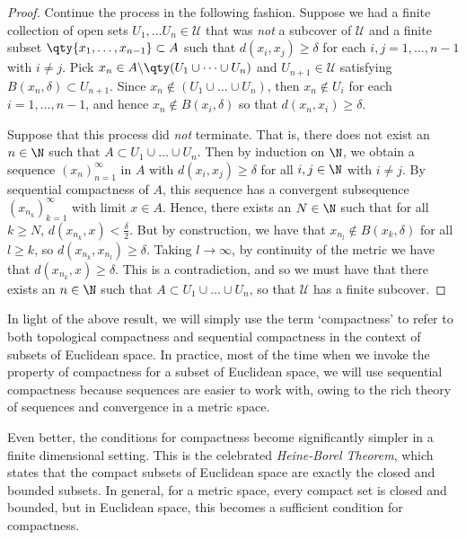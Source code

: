 \begin{proof}
   \vspace{3mm}

   Continue the process in the following fashion. Suppose we had a finite collection of open sets \( U_1,\dots U_n\in\mathcal{U} \) that was \emph{not} a subcover of \( \mathcal{U} \) and a finite subset \( \qty{x_1,\dots,x_{n-1}}\subset A \) such that \( d(x_i,x_j)\geq\delta \) for each \( i,j=1,\dots,n-1 \) with \( i\neq j \). Pick \( x_n\in A\backslash\qty(U_1\cup\dots\cup U_n) \) and \( U_{n+1}\in\mathcal{U} \) satisfying \( B(x_n,\delta)\subset U_{n+1} \). Since \( x_n\notin (U_1\cup\dots\cup U_n) \), then \( x_n\notin U_i \) for each \( i=1,\dots,n-1 \), and hence \( x_n\notin B(x_i,\delta) \) so that \( d(x_n,x_i)\geq\delta \).

   \vspace{3mm}

   Suppose that this process did \emph{not} terminate. That is, there does not exist an \( n\in\N \) such that \( A\subset U_1\cup\dots\cup U_n \). Then by induction on \( \N \), we obtain a sequence \( (x_n)_{n=1}^\infty \) in \( A \) with \( d(x_i,x_j)\geq\delta \) for all \( i,j\in\N \) with \( i\neq j \). By sequential compactness of \( A \), this sequence has a convergent subsequence \( (x_{n_k})_{k=1}^\infty \) with limit \( x\in A \). Hence, there exists an \( N\in\N \) such that for all \( k\geq N \), \( d(x_{n_k},x)<\frac{\delta}{2} \). But by construction, we have that \( x_{n_l}\notin B(x_k,\delta) \) for all \( l\geq k \), so \( d(x_{n_k},x_{n_l})\geq\delta \). Taking \( l\to\infty \), by continuity of the metric we have that \( d(x_{n_k},x)\geq\delta \). This is a contradiction, and so we must have that there exists an \( n\in\N \) such that \( A\subset U_1\cup\dots\cup U_n \), so that \( \mathcal{U} \) has a finite subcover.
 \end{proof}

 In light of the above result, we will simply use the term `compactness' to refer to both topological compactness and sequential compactness in the context of subsets of Euclidean space. In practice, most of the time when we invoke the property of compactness for a subset of Euclidean space, we will use sequential compactness because sequences are easier to work with, owing to the rich theory of sequences and convergence in a metric space.

 \vspace{3mm}

 Even better, the conditions for compactness become significantly simpler in a finite dimensional setting. This is the celebrated \emph{Heine-Borel Theorem}, which states that the compact subsets of Euclidean space are exactly the closed and bounded subsets. In general, for a metric space, every compact set is closed and bounded, but in Euclidean space, this becomes a sufficient condition for compactness.

